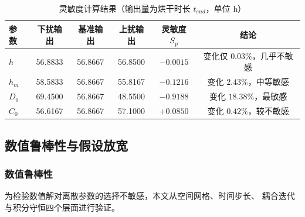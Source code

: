 \documentclass[12pt,a4paper]{article}
\begin{document}
\begin{center}
\begin{table}[H]
\centering
\caption{灵敏度计算结果（输出量为烘干时长 $t_{end}$，单位 h）}
\label{tab:sensitivity-result}
\begin{tabular}{lccccc}
\toprule
参数 & 下扰输出 & 基准输出 & 上扰输出 & 灵敏度 $S_p$ & 结论\\
\midrule
$h$ & 56.8833 & 56.8667 & 56.8500 & $-0.0015$ & 变化仅 $0.03\%$，几乎不敏感\\
$h_m$ & 58.5833 & 56.8667 & 55.8167 & $-0.1216$ & 变化 $2.43\%$，中等敏感\\
$D_0$ & 69.4500 & 56.8667 & 48.5500 & $-0.9188$ & 变化 $18.38\%$，最敏感\\
$C_0$ & 56.6167 & 56.8667 & 57.1000 & $+0.0850$ & 变化 $0.42\%$，较不敏感\\
\bottomrule
\end{tabular}
\end{table}

\subsection{数值鲁棒性与假设放宽}


\subsubsection{数值鲁棒性}
为检验数值解对离散参数的选择不敏感，本文从空间网格、时间步长、
耦合迭代与积分守恒四个层面进行验证。


\end{center}
\end{document}
